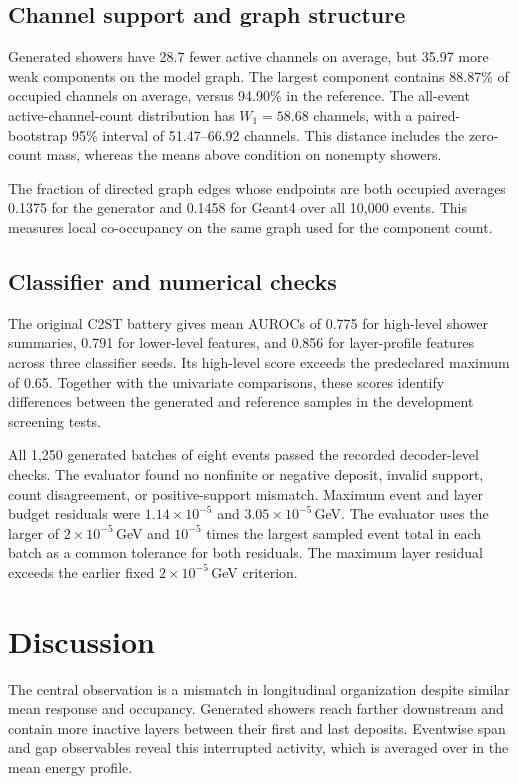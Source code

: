 \documentclass[11pt]{article}
\begin{document}
\subsection{Channel support and graph structure}

Generated showers have 28.7 fewer active channels on average, but 35.97 more weak components on the model graph. The largest component contains 88.87\% of occupied channels on average, versus 94.90\% in the reference. The all-event active-channel-count distribution has $W_1=58.68$ channels, with a paired-bootstrap 95\% interval of 51.47--66.92 channels. This distance includes the zero-count mass, whereas the means above condition on nonempty showers.

The fraction of directed graph edges whose endpoints are both occupied averages 0.1375 for the generator and 0.1458 for Geant4 over all 10,000 events. This measures local co-occupancy on the same graph used for the component count.

\subsection{Classifier and numerical checks}

The original C2ST battery gives mean AUROCs of 0.775 for high-level shower summaries, 0.791 for lower-level features, and 0.856 for layer-profile features across three classifier seeds. Its high-level score exceeds the predeclared maximum of 0.65. Together with the univariate comparisons, these scores identify differences between the generated and reference samples in the development screening tests.

All 1,250 generated batches of eight events passed the recorded decoder-level checks. The evaluator found no nonfinite or negative deposit, invalid support, count disagreement, or positive-support mismatch. Maximum event and layer budget residuals were $1.14\times10^{-5}$ and $3.05\times10^{-5}$\,GeV. The evaluator uses the larger of $2\times10^{-5}$\,GeV and $10^{-5}$ times the largest sampled event total in each batch as a common tolerance for both residuals. The maximum layer residual exceeds the earlier fixed $2\times10^{-5}$\,GeV criterion.

\section{Discussion}
\label{sec:discussion}

The central observation is a mismatch in longitudinal organization despite similar mean response and occupancy. Generated showers reach farther downstream and contain more inactive layers between their first and last deposits. Eventwise span and gap observables reveal this interrupted activity, which is averaged over in the mean energy profile.
\end{document}
